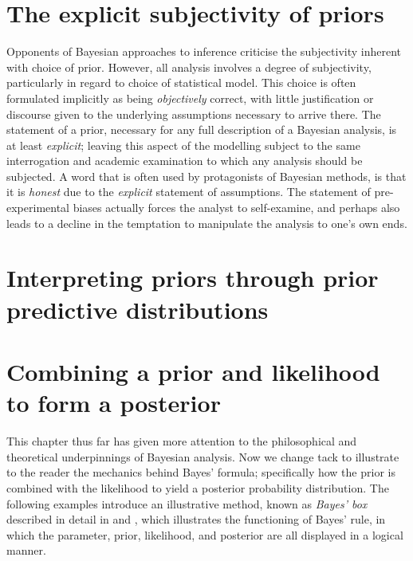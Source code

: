 \documentclass[11pt,fullpage]{book}
\begin{document}
\section{The explicit subjectivity of priors}
Opponents of Bayesian approaches to inference criticise the subjectivity inherent with choice of prior. However, all analysis involves a degree of subjectivity, particularly in regard to choice of statistical model. This choice is often formulated implicitly as being \textit{objectively} correct, with little justification or discourse given to the underlying assumptions necessary to arrive there. The statement of a prior, necessary for any full description of a Bayesian analysis, is at least \textit{explicit}; leaving this aspect of the modelling subject to the same interrogation and academic examination to which any analysis should be subjected. A word that is often used by protagonists of Bayesian methods, is that it is \textit{honest} due to the \textit{explicit} statement of assumptions. The statement of pre-experimental biases actually forces the analyst to self-examine, and perhaps also leads to a decline in the temptation to manipulate the analysis to one's own ends.

\section{Interpreting priors through prior predictive distributions}\label{sec:Priors_priorPredictiveDistribution}


\section{Combining a prior and likelihood to form a posterior} 
This chapter thus far has given more attention to the philosophical and theoretical underpinnings of Bayesian analysis. Now we change tack to illustrate to the reader the mechanics behind Bayes' formula; specifically how the prior is combined with the likelihood to yield a posterior probability distribution. The following examples introduce an illustrative method, known as \textit{Bayes' box} described in detail in \cite{stewart2014teaching} and \cite{bolstad2007introduction}, which illustrates the functioning of Bayes' rule, in which the parameter, prior, likelihood, and posterior are all displayed in a logical manner.
\end{document}
